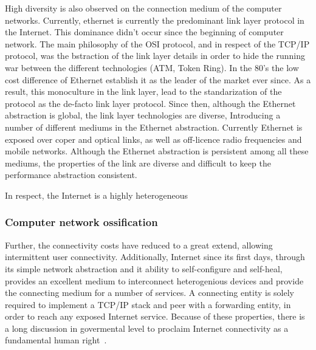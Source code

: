 High diversity is also observed on the connection medium of the computer
networks. Currently, ethernet is currently the predominant link layer protocol
in the Internet. This dominance didn't occur since the beginning of computer
network. The main philosophy of the OSI protocol, and in respect of the TCP/IP
protocol, was the bstraction of the link layer details in order to hide the
running war between the different technologies (ATM, Token Ring). In the 80's
the low cost difference of Ethernet establish it as the leader of the market
ever since. As a result, this monoculture in the link layer, lead to the
standarization of the protocol as the de-facto link layer protocol. Since then,
although the Ethernet abstraction is global, the link layer technologies are
diverse, Introducing a number of different mediums in the Ethernet abstraction.
Currently Ethernet is exposed over coper and optical links, as well as
off-licence radio frequencies and mobile networks. Although the Ethernet
abstraction is persistent among all these mediums, the properties of the link
are diverse and difficult to keep the performance abstraction consistent.

In respect, the Internet is a highly heterogeneous 


\subsubsection{Computer network ossification}




Further, the connectivity costs have reduced to a great extend, allowing
intermittent user connectivity.  Additionally, Internet since its first days,
through its simple network abstraction and it ability to self-configure and
self-heal, provides an excellent medium to interconnect heterogenious devices
and provide the connecting medium for a number of services. A connecting entity
is solely required to implement a TCP/IP stack and peer with a forwarding
entity, in order to reach any exposed Internet service.  Because of these
properties, there is a long discussion in govermental level to proclaim Internet
connectivity as a fundamental human right~\cite{klang2005human}.

